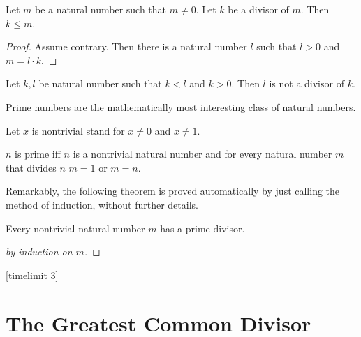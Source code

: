 \documentclass{article}
\begin{document}
\begin{forthel}
\begin{lemma}
Let $m$ be a natural number such that $m \neq 0$.
Let $k$ be a divisor of $m$.
Then $k \leq m$.
\end{lemma}
\begin{proof}
Assume contrary.
Then there is a natural number $l$ such that
$l > 0$ and $m = l \cdot k$.
\end{proof}

\begin{proposition}
Let $k,l$ be natural number such that $k < l$ and $k > 0$.
Then $l$ is not a divisor of $k$.
\end{proposition}

\end{forthel}
%
Prime numbers are the mathematically most interesting
class of natural numbers.
%
\begin{forthel}
Let $x$ is nontrivial stand for $x \neq 0$ and $x \neq 1$.

\begin{definition}
$n$ is prime iff $n$ is a nontrivial natural number and
for every natural number $m$ that divides $n$ $m = 1$ or $m = n$.
\end{definition}
\end{forthel}
%
Remarkably, the following theorem is proved automatically by
just calling the method of induction, without further details.  
%
\begin{forthel}
[timelimit 10]
\begin{theorem}
Every nontrivial natural number $m$ has a prime divisor.
\end{theorem}
\begin{proof}[by induction on $m$]
\end{proof}
[timelimit 3]
\end{forthel}

\section{The Greatest Common Divisor}
\end{document}
